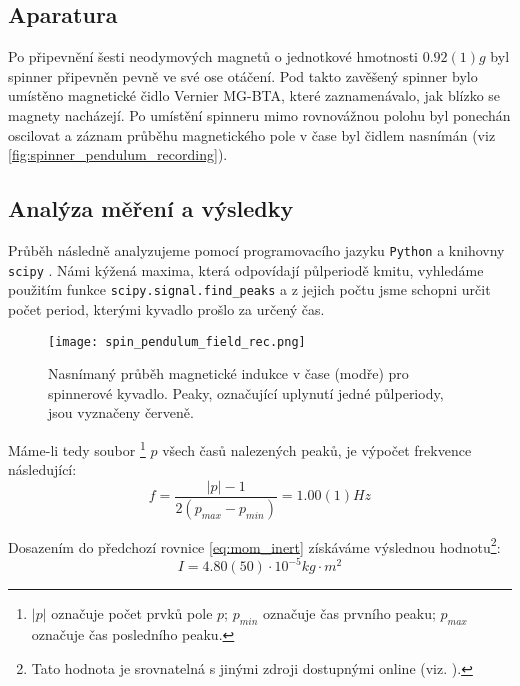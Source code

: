 \subsection{Aparatura}
Po připevnění šesti neodymových magnetů o jednotkové hmotnosti $0.92(1) g$ byl spinner připevněn pevně ve své ose otáčení.
Pod takto zavěšený spinner bylo umístěno magnetické čidlo Vernier MG-BTA, které zaznamenávalo, jak blízko se magnety nacházejí.
Po umístění spinneru mimo rovnovážnou polohu byl ponechán oscilovat a záznam průběhu magnetického pole v čase byl čidlem nasnímán (viz \autoref{fig:spinner_pendulum_recording}).
\vspace{40pt}

{\raggedright
    \subsection{Analýza měření a výsledky}
    Průběh následně analyzujeme pomocí programovacího jazyku \texttt{Python} \cite{python} a knihovny \texttt{scipy} \cite{scipy}.
    Námi kýžená maxima, která odpovídají půlperiodě kmitu, vyhledáme použitím funkce \texttt{scipy.signal.find\_peaks} a z jejich počtu jsme schopni určit počet period, kterými kyvadlo prošlo za určený čas.
}

\begin{wrapfigure}{r}{1\textwidth}
    \texttt{[image: spin\_pendulum\_field\_rec.png]}
    \centering
    \caption[Nasnímaný průběh magnetické indukce v čase pro spinnerové kyvadlo]{Nasnímaný průběh magnetické indukce v čase (modře) pro spinnerové kyvadlo. Peaky, označující uplynutí jedné půlperiody, jsou vyznačeny červeně.}
    \label{fig:spinner_pendulum_recording}
\end{wrapfigure}

\clearpage

Máme-li tedy soubor \footnote{$|p|$ označuje počet prvků pole $p$; $p_{min}$ označuje čas prvního peaku; $p_{max}$ označuje čas posledního peaku.} $p$ všech časů nalezených peaků, je výpočet frekvence následující:
\begin{equation}
    \label{eq:freq_from_peaks}
    f = \frac{ |p| - 1}{2(p_{max} - p_{min})} = 1.00(1)Hz
\end{equation}

Dosazením do předchozí rovnice \ref{eq:mom_inert} získáváme výslednou hodnotu\footnote{Tato hodnota je srovnatelná s jinými zdroji dostupnými online (viz. \cite{spinner_mom_inert_external}).}:
\begin{equation}
    \label{eq:mom_inert_results}
    I = 4.80(50) \cdot 10^{-5} kg \cdot m^2
\end{equation}

